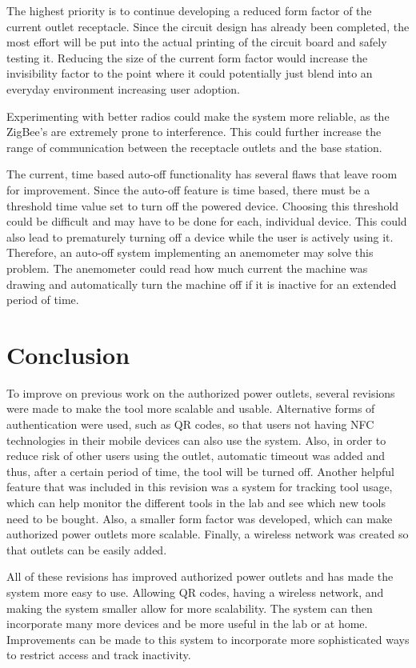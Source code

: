 \documentclass{sigchi}
\begin{document}
The highest priority is to continue developing a reduced form factor of the current outlet receptacle. Since the circuit design has already been completed, the most effort will be put into the actual printing of the circuit board and safely testing it. Reducing the size of the current form factor would increase the invisibility factor to the point where it could potentially just blend into an everyday environment increasing user adoption.

Experimenting with better radios could make the system more reliable, as the ZigBee’s are extremely prone to interference. This could further increase the range of communication between the receptacle outlets and the base station. 

The current, time based auto-off functionality has several flaws that leave room for improvement. Since the auto-off feature is time based, there must be a threshold time value set to turn off the powered device. Choosing this threshold could be difficult and may have to be done for each, individual device. This could also  lead to prematurely turning off a device while the user is actively using it. Therefore, an auto-off system implementing an anemometer may solve this problem. The anemometer could read how much current the machine was drawing and automatically turn the machine off if it is inactive for an extended period of time.

\section{Conclusion}
To improve on previous work on the authorized power outlets, several revisions were made to make the tool more scalable and usable. Alternative forms of authentication were used, such as QR codes, so that users not having NFC technologies in their mobile devices can also use the system. Also, in order to reduce risk of other users using the outlet, automatic timeout was added and thus, after a certain period of time, the tool will be turned off. Another helpful feature that was included in this revision was a system for tracking tool usage, which can help monitor the different tools in the lab and see which new tools need to be bought. Also, a smaller form factor was developed, which can make authorized power outlets more scalable. Finally, a wireless network was created so that outlets can be easily added.

All of these revisions has improved authorized power outlets and has made the system more easy to use. Allowing QR codes, having a wireless network, and making the system smaller allow for more scalability. The system can then incorporate many more devices and be more useful in the lab or at home. Improvements can be made to this system to incorporate more sophisticated ways to restrict access and track inactivity.
\end{document}
